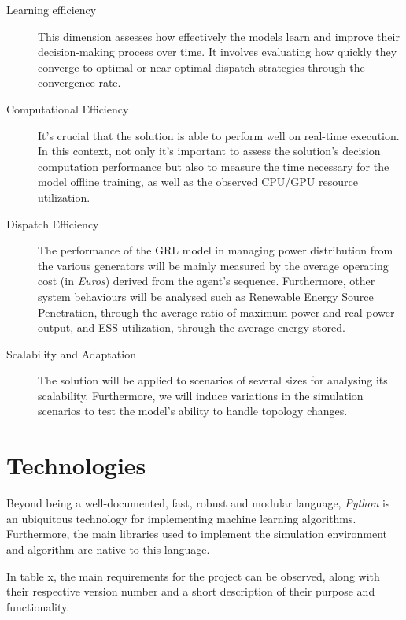 \begin{description}
	\item[Learning efficiency] This dimension assesses how effectively the models learn and improve their decision-making process over time. It involves evaluating how quickly they converge to optimal or near-optimal dispatch strategies through the convergence rate. 
	
	\item[Computational Efficiency] It's crucial that the solution is able to perform well on real-time execution. In this context, not only it's important to assess the solution's decision computation performance but also to measure the time necessary for the model offline training, as well as the observed CPU/GPU resource utilization.
	
	\item[Dispatch Efficiency] The performance of the \ac{GRL} model in managing power distribution from the various generators will be mainly measured by the average operating cost (in \textit{Euros}) derived from the agent's sequence. Furthermore, other system behaviours will be analysed such as Renewable Energy Source Penetration, through the average ratio of maximum power and real power output, and \ac{ESS} utilization, through the average energy stored.
	
	\item[Scalability and Adaptation]  The solution will be applied to scenarios of several sizes for analysing its scalability. Furthermore, we will induce variations in the simulation scenarios to test the model's ability to handle topology changes.
\end{description}

\section{Technologies}

Beyond being a well-documented, fast, robust and modular language, \textit{Python} is an ubiquitous technology for implementing machine learning algorithms. Furthermore, the main libraries used to implement the simulation environment and algorithm are native to this language.
\par
In table x, the main requirements for the project can be observed, along with their respective version number and a short description of their purpose and functionality.
\par

